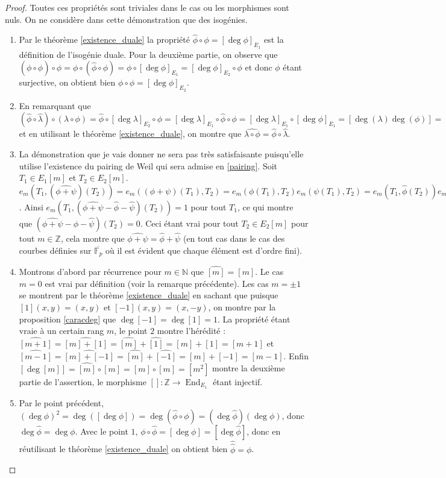 \documentclass{article}
\theoremstyle{plain}%
\theoremstyle{definition}%
\newcommand{\F}{\mathbb{F}}
\newcommand{\Z}{\mathbb{Z}}
\newcommand{\N}{\mathbb{N}}
\newcommand{\h}{\widehat}
\newcommand{\ol}{\overline}
\DeclareMathOperator{\End}{End}
\begin{document}
\begin{proof}
  Toutes ces propriétés sont triviales dans le cas ou les morphismes sont nuls. On ne considère dans cette démonstration que des isogénies.
  \begin{enumerate}
    \item Par le théorème \ref{existence_duale} la propriété $\h\phi\circ\phi = [\deg{\phi}]_{E_1}$ est la définition de l'isogénie duale. Pour la deuxième partie, on observe que $(\phi\circ\h\phi)\circ\phi = \phi\circ(\h\phi\circ\phi) = \phi\circ[\deg{\phi}]_{E_1} = [\deg{\phi}]_{E_2}\circ\phi$ et donc $\phi$ étant surjective, on obtient bien $\phi\circ\h\phi = [\deg{\phi}]_{E_2}$.
    \item En remarquant que $(\h\phi\circ\h\lambda)\circ(\lambda\circ\phi) = \h\phi\circ [\deg\lambda]_{E_2} \circ\phi = [\deg\lambda]_{E_1}\circ\h\phi\circ\phi = [\deg\lambda]_{E_1}\circ [\deg\phi]_{E_1} = [\deg(\lambda)\deg(\phi)] = [\deg(\lambda\circ\phi)]$ et en utilisant le théorème \ref{existence_duale}, on montre que $\h{\lambda\circ\phi} = \h\phi\circ\h\lambda$.
    
    \item La démonstration que je vais donner ne sera pas très satisfaisante puisqu'elle utilise l'existence du pairing de Weil qui sera admise en \ref{pairing}. Soit $T_1\in E_1[m]$ et $T_2\in E_2[m]$. $e_m(T_1, (\h{\phi +\psi})(T_2)) = e_m((\phi+\psi)(T_1), T_2) = e_m(\phi(T_1), T_2)e_m(\psi (T_1), T_2) = e_m(T_1, \h\phi (T_2))e_m(T_1, \h\psi (T_2)) = e_m(T_1, (\h\phi + \h\psi)(T_2))$. Ainsi $e_m(T_1, (\h{\phi + \psi} - \h\phi -\h\psi)(T_2)) = 1$ pour tout $T_1$, ce qui montre que $(\h{\phi + \psi} - \h\phi -\h\psi)(T_2) = 0$. Ceci étant vrai pour tout $T_2\in E_2[m]$ pour tout $m\in\Z$, cela montre que  $\h{\phi+\psi} = \h\phi + \h\psi$ (en tout cas dans le cas des courbes définies sur $\ol{\F_p}$ où il est évident que chaque élément est d'ordre fini).

    \item Montrons d'abord par récurrence pour $m\in\N$ que $\h{[m]} = [m]$. Le cas $m=0$ est vrai par définition (voir la remarque précédente). Les cas $m = \pm 1$ se montrent par le théorème \ref{existence_duale} en sachant que puisque $[1](x, y) = (x, y)$ et $[-1](x, y) = (x, -y)$, on montre par la proposition \ref{caracdeg} que $\deg[-1] = \deg[1] = 1$. La propriété étant vraie à un certain rang $m$, le point $2$ montre l'hérédité : $\h{[m+1]} = \h{[m] + [1]} = \h{[m]} + \h{[1]} = [m] + [1] = [m+1]$ et $\h{[m-1]} = \h{[m] + [-1]} = \h{[m]} + \h{[-1]} = [m] + [-1] = [m-1]$.
      Enfin $[\deg [m]] = \h{[m]} \circ [m] = [m] \circ [m] = [m^2]$ montre la deuxième partie de l'assertion, le morphisme $[]:\Z\to \End_{E_1}$ étant injectif.
    \item Par le point précédent, $ (\deg\phi)^2=\deg([\deg\phi])=\deg(\h\phi\circ\phi) = (\deg\h\phi)(\deg\phi)$, donc $\deg\h\phi = \deg\phi$. Avec le point $1$, $\phi\circ\h\phi = [\deg\phi] = [\deg \h\phi]$, donc en réutilisant le théorème \ref{existence_duale} on obtient bien $\h{\h\phi} = \phi$.
  \end{enumerate}
\end{proof}
\end{document}
